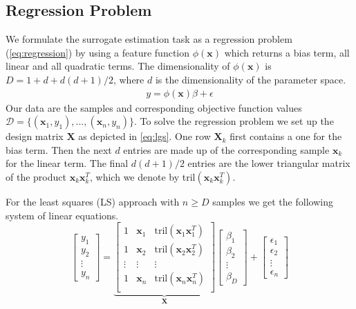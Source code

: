 \subsection{Regression Problem}
We formulate the surrogate estimation task as
a regression problem (\ref{eq:regression}) by using
a feature function $\phi(\mathbf{x})$ which returns
a bias term, all linear and all quadratic terms. The dimensionality of
$\phi(\mathbf{x})$ is $D = 1 + d + d(d + 1) / 2$, where $d$
is the dimensionality of the parameter space.
\begin{align}
  \label{eq:regression}
  y = \phi(\mathbf{x}) \beta + \epsilon
\end{align}
Our data are the samples and corresponding objective function
values $\mathcal{D} = \{(\mathbf{x}_1, y_1),...,(\mathbf{x}_n, y_n)\}$.
To solve the regression problem we set up
the design matrix $\mathbf{X}$ as depicted in \cref{eq:lgs}.
One row $\mathbf{X}_{k}$ first contains a one for the bias term.
Then the next $d$ entries are made up of the corresponding
sample $\mathbf{x}_k$ for the linear term.
The final $d(d + 1) / 2$  entries are
the lower triangular matrix of the product $\mathbf{x}_k \mathbf{x}_k^T$,
which we denote by tril$(\mathbf{x}_k \mathbf{x}_k^T)$.

For the least squares (LS) approach with $n \geq D$ samples
we get the following system of linear equations. 
\begin{equation}
  \label{eq:lgs}
\begin{bmatrix} y_1 \\ y_2 \\ \vdots \\ y_n \end{bmatrix}
=
\underbrace{
\begin{bmatrix}
  1 & \mathbf{x}_1 & \text{tril}(\mathbf{x}_1 \mathbf{x}_1^T) \\
  1 & \mathbf{x}_2 & \text{tril}(\mathbf{x}_2 \mathbf{x}_2^T) \\
  \vdots & \vdots & \vdots \\
  1 & \mathbf{x}_n & \text{tril}(\mathbf{x}_n \mathbf{x}_n^T) \\
\end{bmatrix}}_{\mathbf{X}}
\begin{bmatrix}
  \beta_1 \\ \beta_2 \\ \vdots \\ \beta_D
\end{bmatrix}
+
\begin{bmatrix}
  \epsilon_1 \\
  \epsilon_2 \\
  \vdots \\
  \epsilon_n
\end{bmatrix}
\end{equation}

